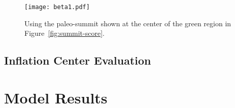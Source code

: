 \begin{figure}
    \texttt{[image: beta1.pdf]}%
    \caption[Best Paleo-Summit Candidate]{Using the paleo-summit shown at the center of the green region in Figure~\ref{fig:summit-score}.}%
    \label{fig:beta1}
\end{figure}

\subsection{Inflation Center Evaluation}


\section{Model Results}

